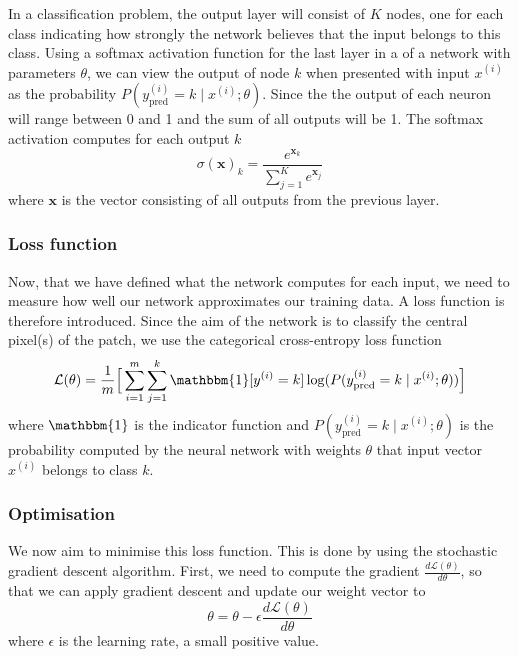 \documentclass[12pt,a4paper,twoside,openright]{report}
\begin{document}
In a classification problem, the output layer will consist of $K$ nodes, one for each class indicating how strongly the network believes that the input belongs to this class. Using a softmax activation function for the last layer in a of a network with parameters $\theta$, we can view the output of node $k$ when presented with input $x^{(i)}$ as the probability $P(y_{\text{pred}}^{(i)} = k \mid x^{(i)};\theta)$. Since the the output of each neuron will range between 0 and 1 and the sum of all outputs will be 1. The softmax activation computes for each output $k$
\begin{equation}
	\sigma(\mathbf{x})_k = \frac{e^{\mathbf{x}_k}}{\sum_{j=1}^{K}e^{\mathbf{x}_j}}
\end{equation}
where $\mathbf{x}$ is the vector consisting of all outputs from the previous layer.

\subsubsection{Loss function}
Now, that we have defined what the network computes for each input, we need to measure how well our network approximates our training data. A loss function is therefore introduced. Since the aim of the network is to classify the central pixel(s) of the patch, we use the categorical cross-entropy loss function
\begin{equation}
	\label{eq:loss}
	\mathcal{L}(\theta) = 
	\frac{1}{m}\Big[\sum_{i=1}^m \sum_{j=1}^k\mathbbm{1}[y^{(i)} = k]\log(P(y_{\text{pred}}^{(i)}=k \mid x^{(i)};\theta))\Big]
\end{equation}
where $\mathbbm{1}$ is the indicator function and $P(y_{\text{pred}}^{(i)}=k \mid x^{(i)};\theta)$ is the probability computed by the neural network with weights $\theta$ that input vector $x^{(i)}$ belongs to class $k$.

\subsubsection{Optimisation}
We now aim to minimise this loss function. This is done by using the stochastic gradient descent algorithm. First, we need to compute the gradient $\frac{d\mathcal{L}(\theta)}{d\theta}$, so that we can apply gradient descent and update our weight vector to
\begin{equation}
	\theta = \theta - \epsilon \frac{d\mathcal{L}(\theta)}{d\theta}
\end{equation}
where $\epsilon$ is the learning rate, a small positive value.
\end{document}
